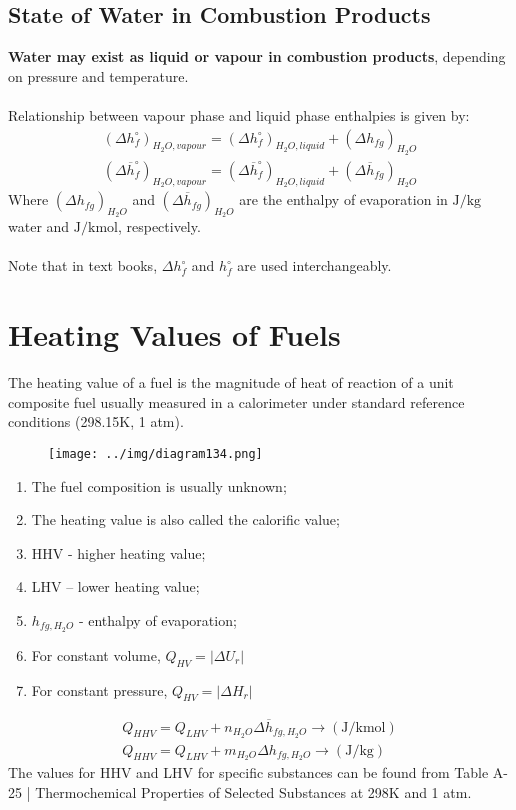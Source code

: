 \documentclass[class=report, crop=false, 12pt,a4paper]{standalone}
\numberwithin{equation}{section}
\begin{document}
\subsection{State of Water in Combustion Products}
\textbf{Water may exist as liquid or vapour in combustion products}, depending on pressure and temperature. \\\\
Relationship between vapour phase and liquid phase enthalpies is given by:
\begin{gather}
  \left(\Delta h_f^\circ\right)_{H_2O,vapour} = \left(\Delta h_f^\circ\right)_{H_2O,liquid} + \left(\Delta h_{fg}\right)_{H_2O} \\[5pt]
  \left(\Delta\overline{h}_f^\circ\right)_{H_2O,vapour} = \left(\Delta\overline{h}_f^\circ\right)_{H_2O,liquid} + \left(\Delta \overline{h}_{fg}\right)_{H_2O}
\end{gather}
Where $\left(\Delta h_{fg}\right)_{H_2O}$ and $\left(\Delta \overline{h}_{fg}\right)_{H_2O}$ are the enthalpy of evaporation in $\si{\joule\per\kilogram}$water and $\si{\joule\per\kilo\mole}$, respectively. \\\\
Note that in text books, $\Delta h_f^\circ$ and $h_f^\circ$ are used interchangeably.
\section{Heating Values of Fuels}
The heating value of a fuel is the magnitude of heat of reaction of a unit composite fuel usually measured in a calorimeter under standard reference conditions (298.15K, 1 atm).
\begin{figure}[H]
  \centering
  \texttt{[image: ../img/diagram134.png]}
  \caption{}
\end{figure}
\begin{enumerate}[noitemsep]
  \item The fuel composition is usually unknown;
  \item The heating value is also called the calorific value;
  \item HHV - higher heating value;
  \item LHV – lower heating value;
  \item $h_{fg,H_2O}$ - enthalpy of evaporation;
  \item For constant volume, $Q_{HV} = |\Delta U_r|$
  \item For constant pressure, $Q_{HV} = |\Delta H_r|$
\end{enumerate}
\begin{gather}
  Q_{HHV} = Q_{LHV} + n_{H_2O}\Delta\overline{h}_{fg,H_2O} \longrightarrow (\si{\joule\per\kilo\mole})\\[5pt]
  Q_{HHV} = Q_{LHV} + m_{H_2O}\Delta h_{fg,H_2O} \longrightarrow (\si{\joule\per\kilogram})
\end{gather}
The values for HHV and LHV for specific substances can be found from Table A-25 | Thermochemical Properties of Selected Substances at 298K and 1 atm.
\end{document}
